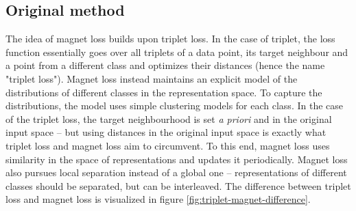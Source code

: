\subsection{Original method}
The idea of magnet loss builds upon triplet loss. In the case of triplet, the loss function essentially goes over all triplets of a data point, its target neighbour and a point from a different class and optimizes their distances (hence the name "triplet loss"). Magnet loss instead maintains an explicit model of the distributions of different classes in the representation space. To capture the distributions, the model uses simple clustering models for each class. In the case of the triplet loss, the target neighbourhood is set \textit{a priori} and in the original input space -- but using distances in the original input space is exactly what triplet loss and magnet loss aim to circumvent. To this end, magnet loss uses similarity in the space of representations and updates it periodically. Magnet loss also pursues local separation instead of a global one -- representations of different classes should be separated, but can be interleaved. The difference between triplet loss and magnet loss is visualized in figure \ref{fig:triplet-magnet-difference}.

